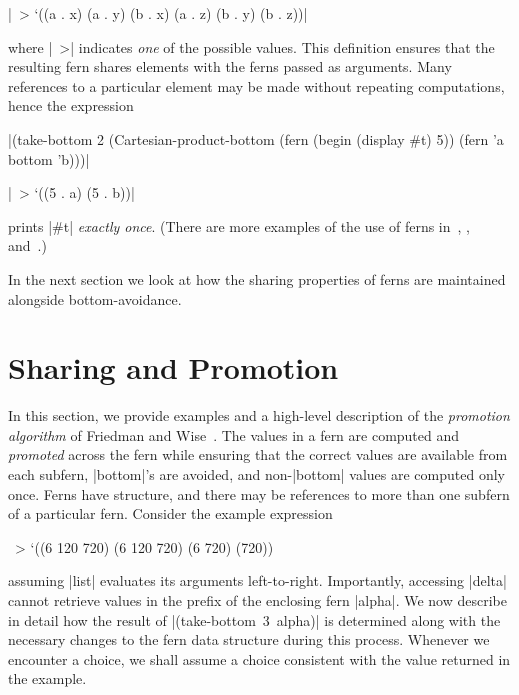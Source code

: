 \schemeresult|~> `((a . x) (a . y) (b . x) (a . z) (b . y) (b . z))|
\belowcodeskip \medskipamount
\medskip

\noindent
where \schemeresult|~>| indicates \emph{one} of the possible values.
This definition ensures that the resulting fern shares
elements with the ferns passed as arguments. Many references to a
particular element may be made without repeating computations, hence the
expression

\wspace

\noindent
\scheme|(take-bottom 2 (Cartesian-product-bottom (fern (begin (display #t) 5)) (fern 'a bottom 'b)))|

\tspace

\noindent
\schemeresult|~> `((5 . a) (5 . b))|
\belowcodeskip \medskipamount
\medskip

\noindent prints \schemeresult|#t| \emph{exactly once}.
(There are more examples of the use of ferns in~\citet{Johnson-83}, \citet{Filman-Friedman-84}, and~\citet{Jeschke-PHD-95}.)

In the next section we look at how the sharing properties of ferns are
maintained alongside bottom-avoidance.

\section{Sharing and Promotion}\label{Sharing}

In this section, we provide examples and a high-level description of
the \emph{promotion algorithm} of Friedman and Wise~\cite{Friedman79b}. 
The values in a fern are computed and
\emph{promoted} across the fern while ensuring that the correct values
are available from each subfern, \scheme|bottom|'s are avoided, and
non-\scheme|bottom| values are computed only once.
Ferns have structure, and there may be references to more than one
subfern of a particular fern. Consider the example expression

\schemedisplayspace
{}

\begin{schemeresponse}~> `((6 120 720) (6 120 720) (6 720) (720))
\end{schemeresponse}

\noindent assuming \scheme|list| evaluates its arguments
left-to-right.  Importantly,
accessing \scheme|delta| cannot retrieve values in the prefix of the
enclosing fern \scheme|alpha|. We now describe in detail how the
result of \mbox{\scheme|(take-bottom 3 alpha)|} is determined along with
the necessary changes to the fern data structure during this
process. Whenever we encounter a choice, we shall assume a choice
consistent with the value returned in the example.

